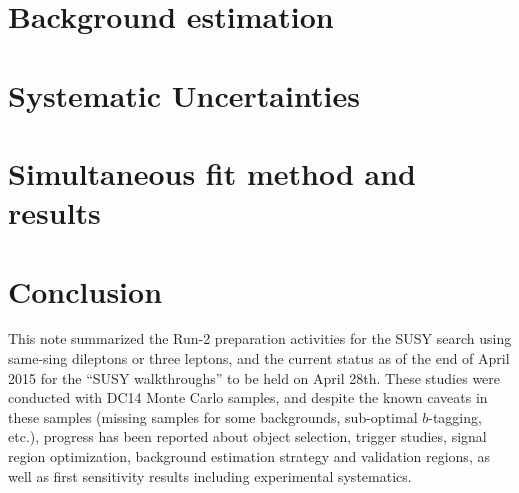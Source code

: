 \documentclass[11pt,a4paper]{atlasnote}
\begin{document}
\section{Background estimation}
\label{sec:bkg}


\section{Systematic Uncertainties}
\label{sec:systematics}


\section{Simultaneous fit method and results}
\label{sec:fit}


\section{Conclusion}  
\label{sec:conclusion}

This note summarized the Run-2 preparation activities for the SUSY search using same-sing dileptons or three leptons, 
and the current status as of the end of April 2015 for the ``SUSY walkthroughs'' to be held on April 28th. 
These studies were conducted with DC14 Monte Carlo samples, and despite the known caveats in these samples (missing samples 
for some backgrounds, sub-optimal $b$-tagging, etc.), progress has been reported about object selection, trigger studies, 
signal region optimization, background estimation strategy and validation regions, as well as first sensitivity results 
including experimental systematics. 


\FloatBarrier
\clearpage






\clearpage
\appendix

%
%






\end{document}
